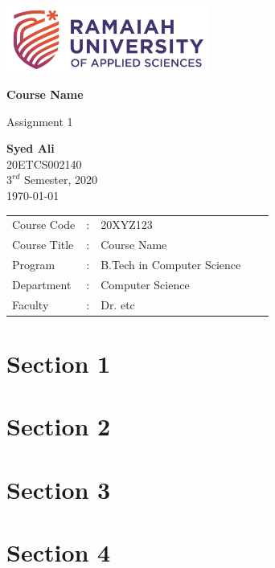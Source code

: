 \documentclass[12pt]{article}
\newcommand{\Course}{Course Name}
\newcommand{\Name}{Syed Ali}
\newcommand{\Regno}{20ETCS002140}
\newcommand{\Batch}{$3^{rd}$ Semester, 2020}
\newcommand{\Date}{\today}
\newcommand{\Courseno}{20XYZ123}
\newcommand{\Program}{B.Tech in Computer Science}
\newcommand{\Department}{Computer Science}
\newcommand{\Faculty}{Dr. etc}
\begin{document}
\onehalfspacing
\begin{titlepage}

  \begin{center}
    \vspace*{\fill}
    \includegraphics[width=0.5\textwidth]{images/school logo.png}
    \vspace{1cm}

    \Huge
    \textbf{\Course}

    \vspace{0.5cm}
    \LARGE
    Assignment 1

    \vspace{1cm}

    \textbf{\Name}
    \vspace{0.5cm}\\
    \Large
    \Regno\\
    \Batch\\
    \Date
    \vspace{1.5cm}

  \end{center}
  \begin{center}
    \Large
    \begin{tabular}{ l l l l l }
      Course Code  & : & \Courseno   \\
      Course Title & : & \Course     \\
      Program      & : & \Program    \\
      Department   & : & \Department \\
      Faculty      & : & \Faculty
    \end{tabular}
  \end{center}
  \vspace*{\fill}
\end{titlepage}

% 
% 

\tableofcontents
\newpage

\section{Section 1}

\newpage

\section{Section 2}

\newpage

\section{Section 3}

\newpage

\section{Section 4}


% 
% 
\end{document}
